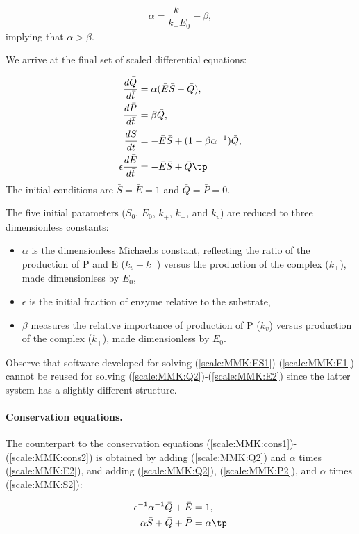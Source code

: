 \documentclass[graybox,envcountchap,sectrefs,final]{svmonodo}
\begin{document}
\[ \alpha = \frac{k_-}{k_+E_0} + \beta,\]
implying that $\alpha > \beta$.

We arrive at the final set of scaled differential equations:

\begin{align}
\frac{d\bar Q}{d\bar t} &= \alpha (\bar E\bar S
- \bar Q),
\label{scale:MMK:Q2}\\ 
\frac{d\bar P}{d\bar t} &= \beta\bar Q,
\label{scale:MMK:P2}\\ 
\frac{d\bar S}{d\bar t} &= -\bar E\bar S
+ (1 - \beta\alpha^{-1})\bar Q,
\label{scale:MMK:S2}\\ 
\epsilon\frac{d\bar E}{d\bar t} &= -\bar E\bar S + \bar Q\tp
\label{scale:MMK:E2}
\end{align}
The initial conditions are $\bar S=\bar E =1$ and $\bar Q=\bar P=0$.

The five initial parameters ($S_0$, $E_0$, $k_+$, $k_-$, and $k_v$)
are reduced to three dimensionless constants:

\begin{itemize}
 \item $\alpha$ is the dimensionless Michaelis constant, reflecting the
   ratio of the production of P and E ($k_v+k_-$) versus the production of
   the complex ($k_+$), made dimensionless by $E_0$,

 \item $\epsilon$ is the initial fraction of enzyme relative to the substrate,

 \item $\beta$ measures the relative importance of production of P ($k_v$)
   versus production of the complex ($k_+$), made dimensionless by $E_0$.
\end{itemize}

\noindent
Observe that software developed for
solving (\ref{scale:MMK:ES1})-(\ref{scale:MMK:E1}) cannot be reused
for solving (\ref{scale:MMK:Q2})-(\ref{scale:MMK:E2}) since the latter
system has a slightly different structure.

\paragraph{Conservation equations.}
The counterpart to the conservation equations
(\ref{scale:MMK:cons1})-(\ref{scale:MMK:cons2}) is obtained by
adding (\ref{scale:MMK:Q2}) and $\alpha$ times (\ref{scale:MMK:E2}),
and adding (\ref{scale:MMK:Q2}), (\ref{scale:MMK:P2}), and
$\alpha$ times (\ref{scale:MMK:S2}):

\begin{align}
\epsilon^{-1}\alpha^{-1}\bar Q + \bar E &= 1,\\ 
\alpha\bar S + \bar Q + \bar P &= \alpha\tp
\end{align}
\end{document}

